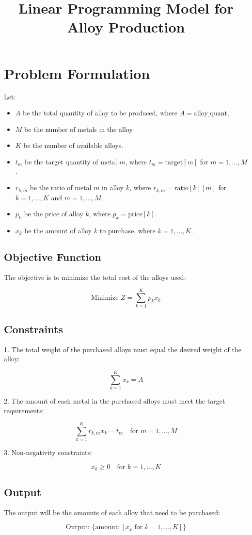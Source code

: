 \documentclass{article}
\begin{document}
\title{Linear Programming Model for Alloy Production}
\author{}
\date{}
\maketitle

\section*{Problem Formulation}

Let:
\begin{itemize}
    \item \( A \) be the total quantity of alloy to be produced, where \( A = \text{alloy\_quant} \).
    \item \( M \) be the number of metals in the alloy.
    \item \( K \) be the number of available alloys.
    \item \( t_m \) be the target quantity of metal \( m \), where \( t_m = \text{target}[m] \) for \( m = 1, \ldots, M \).
    \item \( r_{k,m} \) be the ratio of metal \( m \) in alloy \( k \), where \( r_{k,m} = \text{ratio}[k][m] \) for \( k = 1, \ldots, K \) and \( m = 1, \ldots, M \).
    \item \( p_k \) be the price of alloy \( k \), where \( p_k = \text{price}[k] \).
    \item \( x_k \) be the amount of alloy \( k \) to purchase, where \( k = 1, \ldots, K \).
\end{itemize}

\subsection*{Objective Function}

The objective is to minimize the total cost of the alloys used:

\[
\text{Minimize } Z = \sum_{k=1}^{K} p_k x_k
\]

\subsection*{Constraints}

1. The total weight of the purchased alloys must equal the desired weight of the alloy:

\[
\sum_{k=1}^{K} x_k = A
\]

2. The amount of each metal in the purchased alloys must meet the target requirements:

\[
\sum_{k=1}^{K} r_{k,m} x_k = t_m \quad \text{for } m = 1, \ldots, M
\]

3. Non-negativity constraints:

\[
x_k \geq 0 \quad \text{for } k = 1, \ldots, K
\]

\subsection*{Output}

The output will be the amounts of each alloy that need to be purchased:

\[
\text{Output: } \{ \text{amount} : [x_k \text{ for } k = 1, \ldots, K] \}
\]
\end{document}

